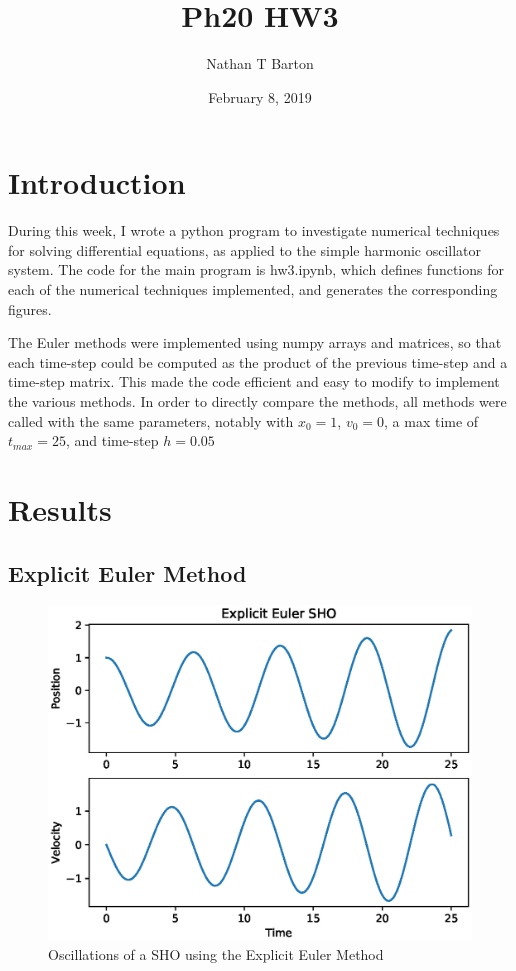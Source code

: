 \documentclass{article}
\title{Ph20 HW3}
\author{Nathan T Barton }
\date{February 8, 2019}
\begin{document}
\maketitle

\section{Introduction}
During this week, I wrote a python program to investigate numerical techniques for solving differential equations, as applied to the simple harmonic oscillator system.  The code for the main program is hw3.ipynb, which defines functions for each of the numerical techniques implemented, and generates the corresponding figures.  

The Euler methods were implemented using numpy arrays and matrices, so that each time-step could be computed as the product of the previous time-step and a time-step matrix.  This made the code efficient and easy to modify to implement the various methods.  In order to directly compare the methods, all methods were called with the same parameters, notably with $x_0 = 1$, $v_0 = 0$, a max time of $t_{max} = 25$, and time-step $h = 0.05$

\newpage

\section{Results}

\subsection{Explicit Euler Method}

\begin{figure}[h!]
\centering
\includegraphics[scale=.75]{fig/explicit_plot.eps}
\caption{Oscillations of a SHO using the Explicit Euler Method}
\label{fig:exp_plot}
\end{figure}
\end{document}

